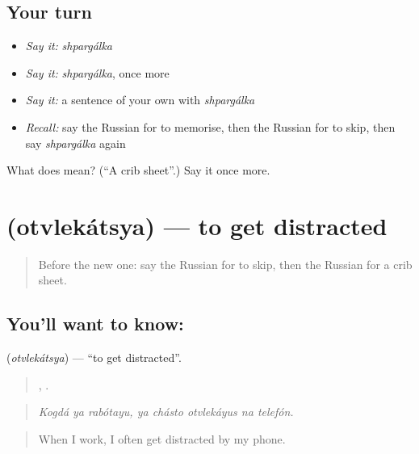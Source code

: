 \subsection*{Your turn}
\begin{itemize}
\raggedright
  \item \emph{Say it:} \emph{shpargálka}
  \item \emph{Say it:} \emph{shpargálka}, once more
  \item \emph{Say it:} a sentence of your own with \emph{shpargálka}
  \item \emph{Recall:} say the Russian for to memorise, then the Russian for to skip, then say \emph{shpargálka} again
\end{itemize}

\begin{tcolorbox}[breakable,colback=teal!4,colframe=teal!35!black,title={Before you move on}]
What does  mean? (\textquotedblleft{}A crib sheet\textquotedblright{}.) Say it once more.
\end{tcolorbox}
\section[\texorpdfstring{\ru{отвлекаться} (otvlekátsya)}{отвлекаться (otvlekátsya)}]{ (otvlekátsya) — to get distracted}

\label{lesson:RU-C384-otvlekatsya}



\begin{quote}
Before the new one: say the Russian for to skip, then the Russian for a crib sheet.
\end{quote}

\subsection*{You'll want to know: }
\textbf{} (\emph{otvlekátsya}) — \textquotedblleft{}to get distracted\textquotedblright{}.

\begin{quote}
  ,     .
\end{quote}

\begin{quote}
\emph{Kogdá ya rabótayu, ya chásto otvlekáyus na telefón.}
\end{quote}

\begin{quote}
When I work, I often get distracted by my phone.
\end{quote}

